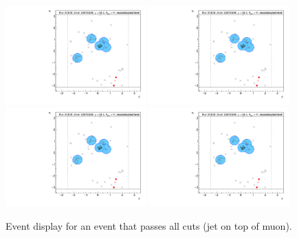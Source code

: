 \begin{figure}[h!]
  \centering
  \includegraphics[page=6,width=0.48\textwidth]{figures/EventDisplays.pdf}
  \includegraphics[page=7,width=0.48\textwidth]{figures/EventDisplays.pdf} \\
  \includegraphics[page=9,width=0.48\textwidth]{figures/EventDisplays.pdf}
  \includegraphics[page=10,width=0.48\textwidth]{figures/EventDisplays.pdf}
  \caption{Event display for an event that passes all cuts (jet on top of muon).}
  \label{fig:event-display-1}
\end{figure}

